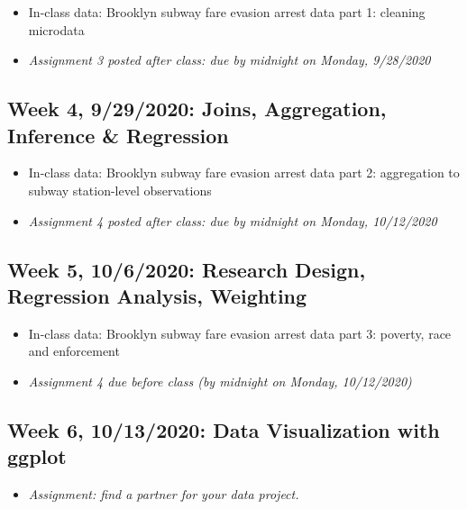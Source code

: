 \documentclass[11pt,]{article}
\providecommand{\tightlist}{%
  \setlength{\itemsep}{0pt}\setlength{\parskip}{0pt}}
\begin{document}
\begin{itemize}
\tightlist
\item
  In-class data: Brooklyn subway fare evasion arrest data part 1:
  cleaning microdata
\item
  \emph{Assignment 3 posted after class: due by midnight on Monday,
  9/28/2020} \medskip
\end{itemize}

\hypertarget{week-4-9292020-joins-aggregation-inference-regression}{%
\subsection{Week 4, 9/29/2020: Joins, Aggregation, Inference \&
Regression}\label{week-4-9292020-joins-aggregation-inference-regression}}

\begin{itemize}
\tightlist
\item
  In-class data: Brooklyn subway fare evasion arrest data part 2:
  aggregation to subway station-level observations
\item
  \emph{Assignment 4 posted after class: due by midnight on Monday,
  10/12/2020} \medskip
\end{itemize}

\hypertarget{week-5-1062020-research-design-regression-analysis-weighting}{%
\subsection{Week 5, 10/6/2020: Research Design, Regression Analysis,
Weighting}\label{week-5-1062020-research-design-regression-analysis-weighting}}

\begin{itemize}
\tightlist
\item
  In-class data: Brooklyn subway fare evasion arrest data part 3:
  poverty, race and enforcement
\item
  \emph{Assignment 4 due before class (by midnight on Monday,
  10/12/2020)} \medskip
\end{itemize}

\hypertarget{week-6-10132020-data-visualization-with-ggplot}{%
\subsection{Week 6, 10/13/2020: Data Visualization with
ggplot}\label{week-6-10132020-data-visualization-with-ggplot}}

\begin{itemize}
\tightlist
\item
  \emph{Assignment: find a partner for your data project.} \medskip
\end{itemize}
\end{document}
